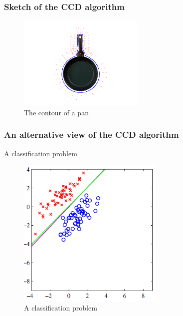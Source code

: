 \documentclass[english,10pt,presentation]{beamer}
\begin{document}
\begin{frame}
\frametitle{Sketch of the CCD algorithm}
\label{sec-2_2}

     \begin{figure}[htb]
     \centering
     \includegraphics[width=6cm,angle=0]{./pan_contour.jpg}
     \caption{\label{fig:contour}The contour of a pan}
     \end{figure}
\end{frame}
\begin{frame}
\frametitle{An alternative view of the CCD algorithm}
\label{sec-2_3}
\begin{exampleblock}{A classification problem}
\label{sec-2_3_1}

    \begin{figure}[htb]
    \centering
    \includegraphics[width=7cm,angle=0]{./classification.png}
    \caption{\label{fig:class}A classification problem   \cite{prml}}
    \end{figure}
\end{exampleblock}
\end{frame}
\end{document}
